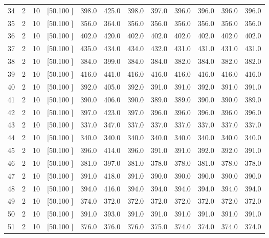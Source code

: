 \documentclass[12pt,a4paper]{article}
\begin{document}
\begin{center}
{\begin{tabular}{r r r r r r r r r r r r}
  34&  2& 10&[50.100    ]&   398.0&   425.0&   398.0&   397.0&   396.0&   396.0&   396.0&   396.0\\[-0.02in]
  35&  2& 10&[50.100    ]&   356.0&   364.0&   356.0&   356.0&   356.0&   356.0&   356.0&   356.0\\[-0.02in]
  36&  2& 10&[50.100    ]&   402.0&   420.0&   402.0&   402.0&   402.0&   402.0&   402.0&   402.0\\[-0.02in]
  37&  2& 10&[50.100    ]&   435.0&   434.0&   434.0&   432.0&   431.0&   431.0&   431.0&   431.0\\[-0.02in]
  38&  2& 10&[50.100    ]&   384.0&   399.0&   384.0&   384.0&   382.0&   384.0&   382.0&   382.0\\[-0.02in]
  39&  2& 10&[50.100    ]&   416.0&   441.0&   416.0&   416.0&   416.0&   416.0&   416.0&   416.0\\[-0.02in]
  40&  2& 10&[50.100    ]&   392.0&   405.0&   392.0&   391.0&   391.0&   392.0&   391.0&   391.0\\[-0.02in]
  41&  2& 10&[50.100    ]&   390.0&   406.0&   390.0&   389.0&   389.0&   390.0&   390.0&   389.0\\[-0.02in]
  42&  2& 10&[50.100    ]&   397.0&   423.0&   397.0&   396.0&   396.0&   396.0&   396.0&   396.0\\[-0.02in]
  43&  2& 10&[50.100    ]&   337.0&   347.0&   337.0&   337.0&   337.0&   337.0&   337.0&   337.0\\[-0.02in]
  44&  2& 10&[50.100    ]&   340.0&   340.0&   340.0&   340.0&   340.0&   340.0&   340.0&   340.0\\[-0.02in]
  45&  2& 10&[50.100    ]&   396.0&   414.0&   396.0&   391.0&   391.0&   392.0&   392.0&   391.0\\[-0.02in]
  46&  2& 10&[50.100    ]&   381.0&   397.0&   381.0&   378.0&   378.0&   381.0&   378.0&   378.0\\[-0.02in]
  47&  2& 10&[50.100    ]&   391.0&   418.0&   391.0&   390.0&   390.0&   390.0&   390.0&   390.0\\[-0.02in]
  48&  2& 10&[50.100    ]&   394.0&   416.0&   394.0&   394.0&   394.0&   394.0&   394.0&   394.0\\[-0.02in]
  49&  2& 10&[50.100    ]&   374.0&   372.0&   372.0&   372.0&   372.0&   372.0&   372.0&   372.0\\[-0.02in]
  50&  2& 10&[50.100    ]&   391.0&   393.0&   391.0&   391.0&   391.0&   391.0&   391.0&   391.0\\[-0.02in]
  51&  2& 10&[50.100    ]&   376.0&   376.0&   376.0&   375.0&   374.0&   374.0&   374.0&   374.0\\[-0.02in]

\end{tabular}}
\end{center}
\end{document}
